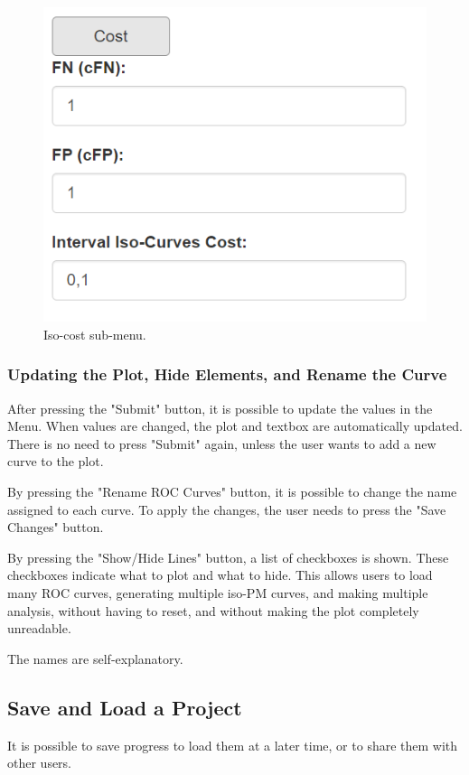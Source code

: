 \documentclass{article}
\begin{document}
	 \begin{figure}[h!]
	 	\centering
	 	\caption{Iso-cost sub-menu.}
	 	\label{fig:isocostSubMenu}
	 	\includegraphics[width=1\linewidth]{Figures/iso_cost_submenu.png}
	 \end{figure}
	
	 \subsubsection{Updating the Plot, Hide Elements, and Rename the Curve}
	 After pressing the "Submit" button, it is possible to update the values in the Menu. When values are changed, the plot and textbox are automatically updated. There is no need to press "Submit" again, unless the user wants to add a new curve to the plot.
	 
	 By pressing the "Rename ROC Curves" button, it is possible to change the name assigned to each curve. To apply the changes, the user needs to press the "Save Changes" button.
	 
	 By pressing the "Show/Hide Lines" button, a list of checkboxes is shown. These checkboxes indicate what to plot and what to hide. This allows users to load many ROC curves, generating multiple iso-PM curves, and making multiple analysis, without having to reset, and without making the plot completely unreadable. 
	 
	 The names are self-explanatory. 
	 
	 \subsection{Save and Load a Project} \label{ssec:oploconfigs}
	 It is possible to save progress to load them at a later time, or to share them with other users.
	 
\end{document}
